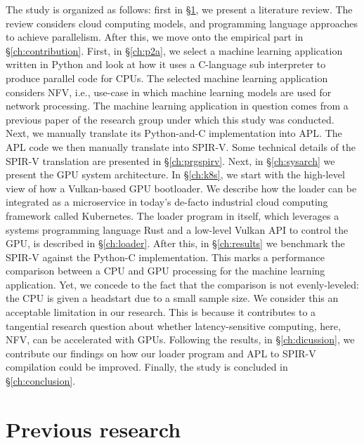 \documentclass{IEEEtran}
\begin{document}
The study is organized as follows: first in §\ref{ch:bg}, we present a literature review. The review considers cloud computing models, and programming language approaches to achieve parallelism. After this, we move onto the empirical part in §\ref{ch:contribution}. First, in §\ref{ch:p2a}, we select a machine learning application written in Python and look at how it uses a C-language sub interpreter to produce parallel code for \glspl{CPU}. The selected machine learning application considers \gls{NFV}, i.e., use-case in which machine learning models are used for network processing. The machine learning application in question comes from a previous paper \cite{brissaud2019transparent} of the research group under which this study was conducted. Next, we manually translate its Python-and-C implementation into \gls{APL}. The APL code we then manually translate into \gls{SPIR-V}. Some technical details of the SPIR-V translation are presented in §\ref{ch:prgspirv}. Next, in §\ref{ch:sysarch} we present the \gls{GPU} system architecture. In §\ref{ch:k8s}, we start with the high-level view of how a Vulkan-based \gls{GPU} bootloader. We describe how the loader can be integrated as a microservice in today's de-facto industrial cloud computing framework called Kubernetes. The loader program in itself, which leverages a systems programming language Rust and a low-level Vulkan \gls{API} to control the \gls{GPU}, is described in §\ref{ch:loader}. After this, in §\ref{ch:results} we benchmark the \gls{SPIR-V} against the Python-C implementation. This marks a performance comparison between a CPU and GPU processing for the machine learning application. Yet, we concede to the fact that the comparison is not evenly-leveled: the CPU is given a headstart due to a small sample size. We consider this an acceptable limitation in our research. This is because it contributes to a tangential research question about whether latency-sensitive computing, here, \gls{NFV}, can be accelerated with \glspl{GPU}. Following the results, in §\ref{ch:dicussion}, we contribute our findings on how our loader program and APL to SPIR-V compilation could be improved.  Finally, the study is concluded in §\ref{ch:conclusion}. 

\section{Previous research}
\label{ch:bg}
\end{document}
